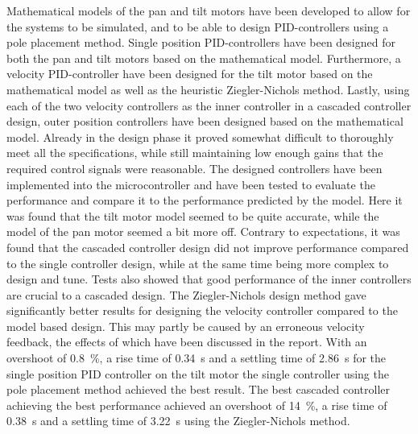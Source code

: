 \documentclass[../../main.tex]{subfiles}
\begin{document}
%

Mathematical models of the pan and tilt motors have been developed to allow for the systems to be simulated, and to be able to design PID-controllers using a pole placement method.
Single position PID-controllers have been designed for both the pan and tilt motors based on the mathematical model. Furthermore, a velocity PID-controller have been designed for the tilt motor based on the mathematical model as well as the heuristic Ziegler-Nichols method. Lastly, using each of the two velocity controllers as the inner controller in a cascaded controller design, outer position controllers have been designed based on the mathematical model. Already in the design phase it proved somewhat difficult to thoroughly meet all the specifications, while still maintaining low enough gains that the required control signals were reasonable.
The designed controllers have been implemented into the microcontroller and have been tested to evaluate the performance and compare it to the performance predicted by the model.
Here it was found that the tilt motor model seemed to be quite accurate, while the model of the pan motor seemed a bit more off.
Contrary to expectations, it was found that the cascaded controller design did not improve performance compared to the single controller design, while at the same time being more complex to design and tune.
Tests also showed that good performance of the inner controllers are crucial to a cascaded design. The Ziegler-Nichols design method gave significantly better results for designing the velocity controller compared to the model based design. This may partly be caused by an erroneous velocity feedback, the effects of which have been discussed in the report.
With an overshoot of \SI{0,8}{\percent}, a rise time of \SI{0,34}{\second} and a settling time of \SI{2,86}{\second} for the single position PID controller on the tilt motor the single controller using the pole placement method achieved the best result. The best cascaded controller achieving the best performance achieved an overshoot of \SI{14}{\percent}, a rise time of \SI{0,38}{\second} and a settling time of \SI{3,22}{\second} using the Ziegler-Nichols method. 

\end{document}

